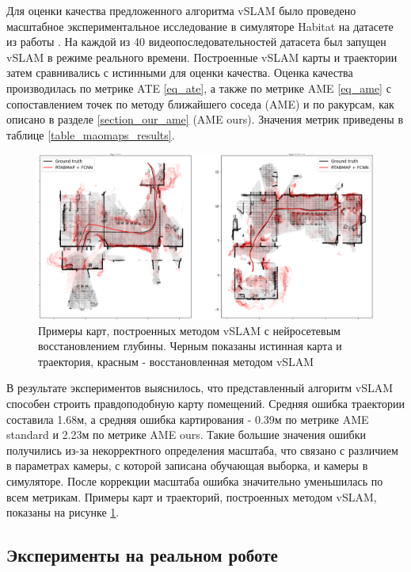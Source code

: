 \documentclass{mipt-thesis-ms}
\begin{document}
	Для оценки качества предложенного алгоритма vSLAM было проведено масштабное экспериментальное исследование в симуляторе Habitat \cite{savva2019habitat} на датасете из работы \cite{bokovoy2021maomaps}. На каждой из 40 видеопоследовательностей датасета был запущен vSLAM в режиме реального времени. Построенные vSLAM карты и траектории затем сравнивались с истинными для оценки качества. Оценка качества производилась по метрике ATE \ref{eq_ate}, а также по метрике AME \ref{eq_ame} с сопоставлением точек по методу ближайшего соседа (AME) и по ракурсам, как описано в разделе \ref{section_our_ame} (AME ours). Значения метрик приведены в таблице \ref{table_maomaps_results}.
	
	\begin{figure}
		\includegraphics[width=1.0\textwidth]{img/1.png}
		\caption{Примеры карт, построенных методом vSLAM с нейросетевым восстановлением глубины. Черным показаны истинная карта и траектория, красным - восстановленная методом vSLAM}
		\label{figure_slam_map_example}
	\end{figure}
	
	В результате экспериментов выяснилось, что представленный алгоритм vSLAM способен строить правдоподобную карту помещений. Средняя ошибка траектории составила 1.68м, а средняя ошибка картирования - 0.39м по метрике AME standard и 2.23м по метрике AME ours. Такие большие значения ошибки получились из-за некорректного определения масштаба, что связано с различием в параметрах камеры, с которой записана обучающая выборка, и камеры в симуляторе. После коррекции масштаба ошибка значительно уменьшилась по всем метрикам. Примеры карт и траекторий, построенных методом vSLAM, показаны на рисунке \ref{figure_slam_map_example}.
	
	\subsection{Эксперименты на реальном роботе}
	
\end{document}
